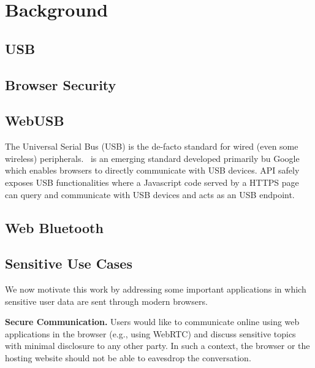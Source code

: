 \section{Background}

\subsection{USB}

\subsection{Browser Security}


\subsection{WebUSB}

The Universal Serial Bus (USB) is the de-facto standard for wired (even some
wireless) peripherals.
\webusb\ is an emerging standard developed primarily bu Google which enables
browsers to directly communicate with USB devices. \webusb API safely exposes
USB functionalities where a Javascript code served by a HTTPS page can query and
communicate with USB devices and acts as an USB endpoint.

\subsection{Web Bluetooth}


\subsection{Sensitive Use Cases}

We now motivate this work by addressing some important applications in which
sensitive user data are sent through modern browsers.

\textbf{Secure Communication.}
Users would like to communicate online using web applications in the browser
(e.g., using WebRTC) and discuss sensitive topics with minimal disclosure to any
other party. In such a context, the browser or the hosting website should not be
able to eavesdrop the conversation.


